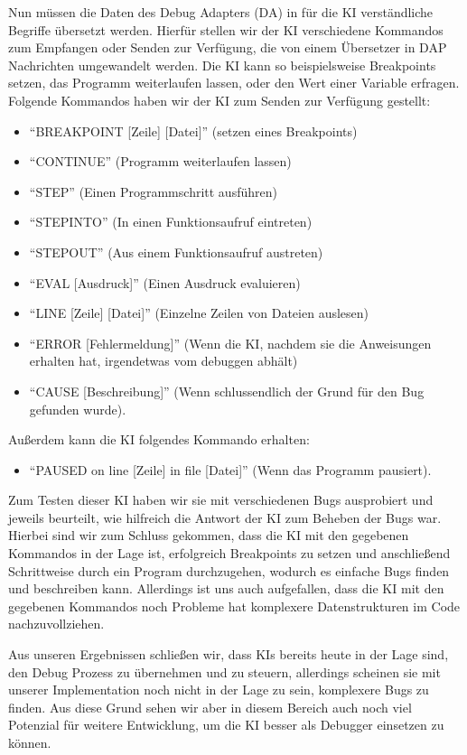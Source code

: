\documentclass[a4paper,12pt,ngerman]{scrartcl}
\begin{document}
Nun müssen die Daten des Debug Adapters (DA) in für die KI verständliche Begriffe übersetzt werden. Hierfür stellen wir der KI verschiedene Kommandos zum Empfangen oder Senden zur Verfügung, die von einem Übersetzer in DAP Nachrichten umgewandelt werden. Die KI kann so beispielsweise Breakpoints setzen, das Programm weiterlaufen lassen, oder den Wert einer Variable erfragen. Folgende Kommandos haben wir der KI zum Senden zur Verfügung gestellt:
\begin{itemize}
	\item ``BREAKPOINT [Zeile] [Datei]'' (setzen eines Breakpoints)
	\item ``CONTINUE'' (Programm weiterlaufen lassen)
	\item ``STEP'' (Einen Programmschritt ausführen)
	\item ``STEPINTO'' (In einen Funktionsaufruf eintreten)
	\item ``STEPOUT'' (Aus einem Funktionsaufruf austreten)
	\item ``EVAL [Ausdruck]'' (Einen Ausdruck evaluieren)
	\item ``LINE [Zeile] [Datei]'' (Einzelne Zeilen von Dateien auslesen)
	\item ``ERROR [Fehlermeldung]'' (Wenn die KI, nachdem sie die Anweisungen erhalten hat, irgendetwas vom debuggen abhält)
	\item ``CAUSE [Beschreibung]'' (Wenn schlussendlich der Grund für den Bug gefunden wurde).
\end{itemize}
Außerdem kann die KI folgendes Kommando erhalten:
\begin{itemize}
	\item ``PAUSED on line [Zeile] in file [Datei]'' (Wenn das Programm pausiert).
\end{itemize}

Zum Testen dieser KI haben wir sie mit verschiedenen Bugs ausprobiert und jeweils beurteilt, wie hilfreich die Antwort der KI zum Beheben der Bugs war. Hierbei sind wir zum Schluss gekommen, dass die KI mit den gegebenen Kommandos in der Lage ist, erfolgreich Breakpoints zu setzen und anschließend Schrittweise durch ein Program durchzugehen, wodurch es einfache Bugs finden und beschreiben kann. Allerdings ist uns auch aufgefallen, dass die KI mit den gegebenen Kommandos noch Probleme hat komplexere Datenstrukturen im Code nachzuvollziehen.

Aus unseren Ergebnissen schließen wir, dass KIs bereits heute in der Lage sind, den Debug Prozess zu übernehmen und zu steuern, allerdings scheinen sie mit unserer Implementation noch nicht in der Lage zu sein, komplexere Bugs zu finden. Aus diese Grund sehen wir aber in diesem Bereich auch noch viel Potenzial für weitere Entwicklung, um die KI besser als Debugger einsetzen zu können.
\end{document}
